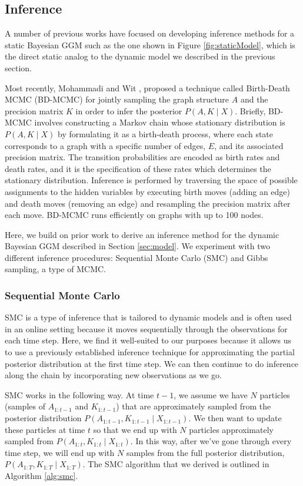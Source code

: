 \documentclass{article}
\begin{document}
\subsection{Inference}
\label{sec:inference}
A number of previous works have focused on developing inference methods for a static Bayesian GGM such as the one shown in Figure \ref{fig:staticModel}, which is the direct static analog to the dynamic model we described in the previous section.

Most recently, Mohammadi and Wit \cite{mohammadi2012efficient}, proposed a technique called Birth-Death MCMC (BD-MCMC) for jointly sampling the graph structure $A$ and the precision matrix $K$ in order to infer the posterior $P(A,K \mid X)$. Briefly, BD-MCMC involves constructing a Markov chain whose stationary distribution is $P(A,K \mid X)$ by formulating it as a birth-death process, where each state corresponds to a graph with a specific number of edges, $E$, and its associated precision matrix. The transition probabilities are encoded as birth rates and death rates, and it is the specification of these rates which determines the stationary distribution. Inference is performed by traversing the space of possible assignments to the hidden variables by executing birth moves (adding an edge) and death moves (removing an edge) and resampling the precision matrix after each move. BD-MCMC runs efficiently on graphs with up to 100 nodes.

Here, we build on prior work to derive an inference method for the dynamic Bayesian GGM described in Section \ref{sec:model}. We experiment with two different inference procedures: Sequential Monte Carlo (SMC) and Gibbs sampling, a type of MCMC. 

\subsubsection{Sequential Monte Carlo}

SMC is a type of inference that is tailored to dynamic models and is often used in an online setting because it moves sequentially through the observations for each time step. Here, we find it well-suited to our purposes because it allows us to use a previously established inference technique for approximating the partial posterior distribution at the first time step. We can then continue to do inference along the chain by incorporating new observations as we go. 

SMC works in the following way. At time $t-1$, we assume we have $N$ particles (samples of $A_{1:t-1}$ and $K_{1:t-1}$) that are approximately sampled from the posterior distribution $P(A_{1:t-1},K_{1:t-1} \mid X_{1:t-1})$. We then want to update these particles at time $t$ so that we end up with $N$ particles approximately sampled from $P(A_{1:t},K_{1:t} \mid X_{1:t})$. In this way, after we've gone through every time step, we will end up with $N$ samples from the full posterior distribution, $P(A_{1:T},K_{1:T} \mid X_{1:T})$. The SMC algorithm that we derived is outlined in Algorithm \ref{alg:smc}. 
\end{document}
